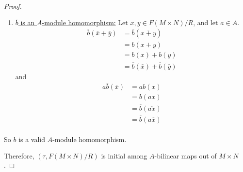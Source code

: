 \documentclass[hidelinks,12pt]{article}
\newcommand{\ul}{\underline}
\begin{document}
\begin{proof}
\begin{enumerate}[label=(\roman*).]
\begin{enumerate}[label=(\alph*).]
        \item \ul{\(\overline{b}\) is an \(A\)-module homomorphism:} Let \(x,y\in F(M\times N)/R\), and let \(a\in A\). 
            \begin{align*}
                \overline{b}\left(\overline{x}+\overline{y}\right)&=\overline{b}\left(\overline{x+y}\right)\\
            &=b\left(x+y\right)\\
            &=b\left(x\right)+b\left(y\right)\\
            &=\overline{b}(\overline{x})+\overline{b}(\overline{y})
            \end{align*}
            and \begin{align*}
                a\overline{b}(\overline{x})&=ab(x)\\
            &=b(ax)\\
            &=\overline{b}(\overline{ax})\\
            &=\overline{b}(a\overline{x})\\
            \end{align*}
    \end{enumerate}
    So \(\overline{b}\) is a valid \(A\)-module homomorphism.
\end{enumerate}
Therefore, \((\tau,F(M\times N)/R)\) is initial among \(A\)-bilinear maps out of \(M\times N\).
\end{proof}
\end{document}
